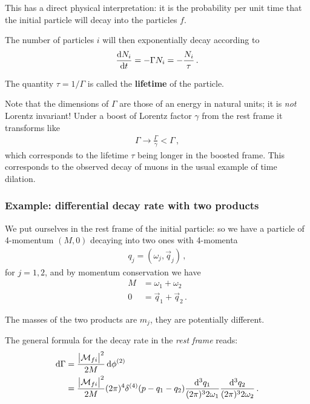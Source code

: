\documentclass[main.tex]{subfiles}
\begin{document}
This has a direct physical interpretation: it is the probability per unit time that the initial particle will decay into the particles \(f\).

The number of particles \(i\) will then exponentially decay according to 
%
\begin{align}
\dv{N_i}{t} = - \Gamma N_i = - \frac{N_i}{\tau }
\,.
\end{align}

The quantity \(\tau  = 1/ \Gamma \) is called the \textbf{lifetime} of the particle. 

Note that the dimensions of \(\Gamma \) are those of an energy in natural units; it is \emph{not} Lorentz invariant! Under a boost of Lorentz factor \(\gamma \) from the rest frame it transforms like 
%
\begin{align}
\Gamma \to \frac{\Gamma}{\gamma } < \Gamma 
\,,
\end{align}
%
which corresponds to the lifetime \(\tau \) being longer in the boosted frame. 
This corresponds to the observed decay of muons in the usual example of time dilation. 

\subsubsection{Example: differential decay rate with two products}

We put ourselves in the rest frame of the initial particle: so
we have a particle of 4-momentum \((M, 0)\) decaying into two ones with 4-momenta 
%
\begin{align}
q_{j} = (\omega_{j}, \vec{q}_{j}) 
\,,
\end{align}
%
for \(j=1, 2\), and by momentum conservation we have 
%
\begin{align}
M &= \omega_{1} + \omega_2  \\
0 &= \vec{q}_{1} + \vec{q}_{2}
\,.
\end{align}

The masses of the two products are \(m_j\), they are potentially different. 

The general formula for the decay rate in the \emph{rest frame} reads: 
%
\begin{align}
\dd{\Gamma} &= \frac{\abs{\mathcal{M}_{fi}}^2}{2M} \dd{\phi }^{(2)}  \\
&= \frac{\abs{\mathcal{M}_{fi}}^2}{2M} (2 \pi )^{4} \delta^{(4)}(p - q_1 - q_2 ) 
\frac{ \dd[3]{q_1 }}{(2\pi )^3 2 \omega_1}
\frac{ \dd[3]{q_2 }}{(2\pi )^3 2 \omega_2}
\,.
\end{align}
\end{document}
